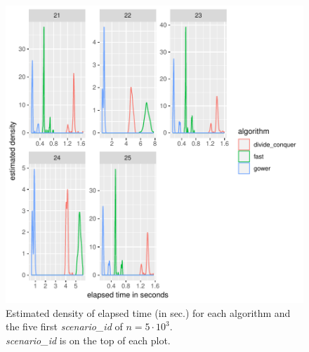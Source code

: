 \documentclass[11pt]{report}
\begin{document}
\begin{figure}[h]
\centering
    \includegraphics[scale=2]{./images/elapsed_time_5000_part1.pdf}
    \caption{
    Estimated density of elapsed time (in sec.) for each algorithm and the five 
    first \textit{scenario\_id} of $n=5 \cdot 10^3$.\\
    \textit{scenario\_id} is on the top of each plot.
    }
\end{figure}

\FloatBarrier
\end{document}
